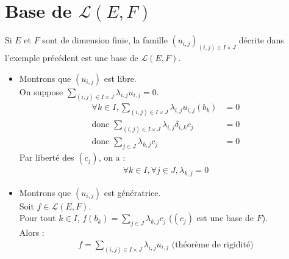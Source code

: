 \documentclass[../main.tex]{subfiles}
\begin{document}
\section{Base de $\mathcal{L}(E, F)$}
\begin{tcolorbox}[title=Propostion 22.30, title filled=false, colframe=lightblue, colback=lightblue!10!white]
    Si $E$ et $F$ sont de dimension finie, la famille $(u_{i, j})_{(i, j)\in I\times J}$ décrite dans l'exemple précédent est une base de $\mathcal{L}(E, F)$. 
\end{tcolorbox}

\begin{itemize}
    \item Montrons que $(u_{i, j})$ est libre. \\
    On suppose $\sum\limits_{(i, j)\in I\times J} \lambda_{i, j} u_{i, j} = 0$. \\
    \begin{align*}
        \forall k \in I, \sum_{(i, j)\in I\times J} \lambda_{i, j} u_{i, j}(b_k) &= 0 \\
        \text{donc } \sum_{(i, j)\in I\times J} \lambda_{i, j} \delta_{i, k} c_j &= 0 \\
        \text{donc } \sum_{j\in J} \lambda_{k, j} c_j &= 0
    \end{align*}
    Par liberté des $(c_j)$, on a :
    \begin{align*}
        \forall k \in I, \forall j \in J, \lambda_{k, j} = 0
    \end{align*}

    \item Montrons que $(u_{i, j})$ est génératrice. \\
    Soit $f\in \mathcal{L}(E, F)$. \\
    Pour tout $k \in I$, $f(b_k) = \sum\limits_{j\in J} \lambda_{k, j} c_j$ ($(c_j)$ est une base de $F$). \\
    Alors : 
    \begin{align*}
        f = \sum_{(i, j) \in I \times J} \lambda_{i, j} u_{i, j} \text{ (théorème de rigidité)}
    \end{align*}
\end{itemize}
\end{document}
